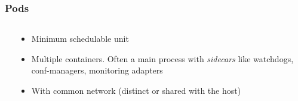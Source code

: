 \documentclass{beamer}
\begin{document}
\begin{frame}
  \frametitle{Pods}
  \begin{columns}
  \begin{column}{0.5\textwidth}
    \begin{center}
    \end{center}
  \end{column}
  \begin{column}{0.5\textwidth}
    \begin{itemize}
      \item<1-> Minimum schedulable unit
      \item<2-> Multiple containers. Often a main process with \textit{sidecars}
        like watchdogs, conf-managers, monitoring adapters
      \item<3-> With common network (distinct or shared with the host)
    \end{itemize}
  \end{column}
  \end{columns}
\end{frame}
\end{document}
